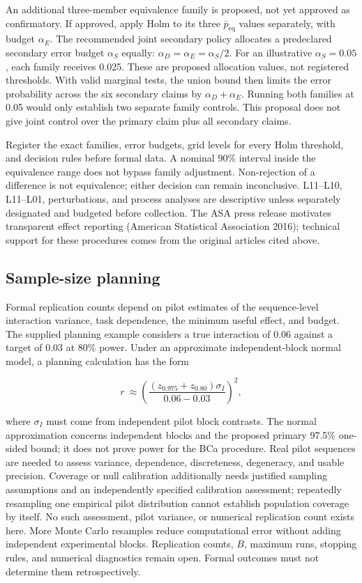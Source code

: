 \documentclass[
  english,
  11pt,
]{article}
\begin{document}
An additional three-member equivalence family is proposed, not yet
approved as confirmatory. If approved, apply Holm to its three
\(\bar p_{\mathrm{eq}}\) values separately, with budget \(\alpha_E\).
The recommended joint secondary policy allocates a predeclared secondary
error budget \(\alpha_S\) equally: \(\alpha_D=\alpha_E=\alpha_S/2\). For
an illustrative \(\alpha_S=0.05\), each family receives 0.025. These are
proposed allocation values, not registered thresholds. With valid
marginal tests, the union bound then limits the error probability across
the six secondary claims by \(\alpha_D+\alpha_E\). Running both families
at 0.05 would only establish two separate family controls. This proposal
does not give joint control over the primary claim plus all secondary
claims.

Register the exact families, error budgets, grid levels for every Holm
threshold, and decision rules before formal data. A nominal 90\%
interval inside the equivalence range does not bypass family adjustment.
Non-rejection of a difference is not equivalence; either decision can
remain inconclusive. L11--L10, L11--L01, perturbations, and process
analyses are descriptive unless separately designated and budgeted
before collection. The ASA press release motivates transparent effect
reporting (American Statistical Association 2016); technical support for
these procedures comes from the original articles cited above.

\subsection{Sample-size planning}\label{sample-size-planning}

Formal replication counts depend on pilot estimates of the
sequence-level interaction variance, task dependence, the minimum useful
effect, and budget. The supplied planning example considers a true
interaction of 0.06 against a target of 0.03 at 80\% power. Under an
approximate independent-block normal model, a planning calculation has
the form

\[
r\ \approx\left(\frac{(z_{0.975}+z_{0.80})\sigma_I}{0.06-0.03}\right)^2,
\]

where \(\sigma_I\) must come from independent pilot block contrasts. The
normal approximation concerns independent blocks and the proposed
primary 97.5\% one-sided bound; it does not prove power for the BCa
procedure. Real pilot sequences are needed to assess variance,
dependence, discreteness, degeneracy, and usable precision. Coverage or
null calibration additionally needs justified sampling assumptions and
an independently specified calibration assessment; repeatedly resampling
one empirical pilot distribution cannot establish population coverage by
itself. No such assessment, pilot variance, or numerical replication
count exists here. More Monte Carlo resamples reduce computational error
without adding independent experimental blocks. Replication counts,
\(B\), maximum runs, stopping rules, and numerical diagnostics remain
open. Formal outcomes must not determine them retrospectively.
\end{document}
